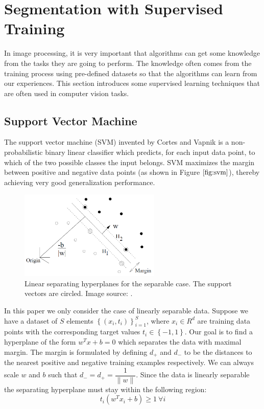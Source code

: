 \documentclass{SMBV12}
\begin{document}
\section{Segmentation with Supervised Training}
\label{sec:supervised_learning}
In image processing, it is very important that algorithms can get some knowledge from the tasks they are going to perform. The knowledge often comes from the training process using pre-defined datasets so that the algorithms can learn from our experiences. This section introduces some supervised learning techniques that are often used in computer vision tasks.

\subsection{Support Vector Machine}
\label{sec:svm}

The support vector machine (SVM) invented by Cortes and Vapnik \cite{cortes1995support} is a non-probabilistic binary linear classifier which predicts, for each input data point, to which of the two possible classes the input belongs. SVM maximizes the margin between positive and negative data points (as shown in Figure $\ref{fig:svm}$), thereby achieving very good generalization performance.

\begin{figure}[htbp]
    \centering
    \includegraphics[width=0.60\textwidth]{images/svm.png}
    \caption{Linear separating hyperplanes for the separable case. The support vectors are circled. Image source: \cite{burges1998tutorial}.}
    \label{fig:svm}
\end{figure}

In this paper we only consider the case of linearly separable data. Suppose we have a dataset of $S$ elements $\left\lbrace (x_i, t_i)\right\rbrace _{i=1}^S$, where $x_i \in R^d$ are training data points with the corresponding target values $t_i \in \left\lbrace -1, 1\right\rbrace $. Our goal is to find a hyperplane of the form $w^T x + b = 0$ which separates the data with maximal margin. The margin is formulated by defining $d_+$ and $d_-$ to be the distances to the nearest positive and negative training examples respectively. We can always scale $w$ and $b$ such that $d_- = d_+ = \dfrac{1}{\|w\|}$. Since the data is linearly separable the separating hyperplane must stay within the following region:
\begin{equation}
t_i(w^T x_i + b) \geq 1\ \forall i
\label{eq:margin}
\end{equation}
\end{document}
